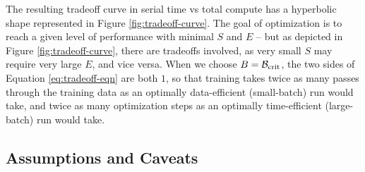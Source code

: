 \documentclass[english]{article}
\begin{document}
The resulting tradeoff curve in serial time vs total compute has a hyperbolic shape represented in Figure \ref{fig:tradeoff-curve}.  The goal of optimization is to reach a given level of performance with minimal $S$ and $E$ -- but as depicted in Figure \ref{fig:tradeoff-curve}, there are tradeoffs involved, as very small $S$ may require very large $E$, and vice versa.   When we choose $B = \mathcal{B}_{{\rm crit}}$, the two sides of Equation \ref{eq:tradeoff-eqn} are both $1$, so that training takes twice as many passes through the training data as an optimally data-efficient (small-batch) run would take, and twice as many optimization steps as an optimally time-efficient (large-batch) run would take.


\subsection{Assumptions and Caveats}
\end{document}
